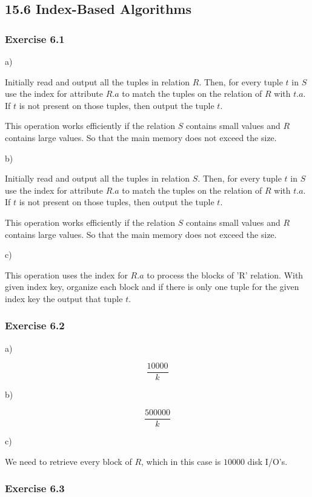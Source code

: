 \documentclass[../../main.tex]{subfiles}
\begin{document}
\subsection{15.6 Index-Based Algorithms}

\subsubsection*{Exercise 6.1}

a)

Initially read and output all the tuples in relation $R$. Then, for every tuple
$t$ in $S$ use the index for attribute $R.a$ to match the tuples on the relation
of $R$ with $t.a$. If $t$ is not present on those tuples, then output the tuple $t$.

This operation works efficiently if the relation $S$ contains small values and
$R$ contains large values. So that the main memory does not exceed the
size.

b)

Initially read and output all the tuples in relation $S$. Then, for every tuple
$t$ in $S$ use the index for attribute $R.a$ to match the tuples on the relation
of $R$ with $t.a$. If $t$ is not present on those tuples, then output the tuple $t$.

This operation works efficiently if the relation $S$ contains small values and
$R$ contains large values. So that the main memory does not exceed the
size.

c)

This operation uses the index for $R.a$ to process the blocks of 'R' relation.
With given index key, organize each block and if there is only one tuple
for the given index key the output that tuple $t$.

\subsubsection*{Exercise 6.2}

a)

$$
\frac{10000}{k}
$$

b)

$$
\frac{500000}{k}
$$

c)

We need to retrieve every block of $R$, which in this case is
$10000$ disk I/O's.

\subsubsection*{Exercise 6.3}
\end{document}
